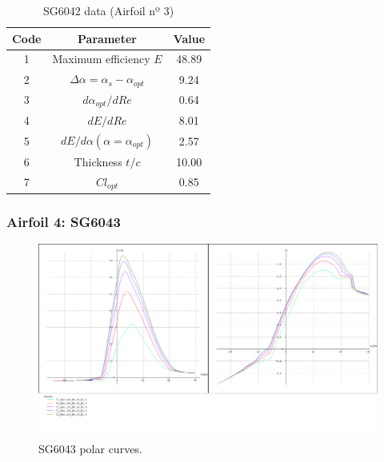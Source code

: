 \documentclass[../TFG_Annex.tex]{subfiles}
\begin{document}
\begin{table}[h!]
	\centering
	\begin{tabular}{c|c|c}
		Code & Parameter                                    & Value  \\ \hline
		1    & Maximum efficiency $E$                      &      48.89          \\
		2    & $\Delta \alpha=\alpha_{s}-\alpha_{opt}$    &            9.24         \\
		3    & ${d\alpha_{opt}}/{dRe}$                     &               0.64    \\
		4    & ${dE}/{dRe}$                                &          8.01          \\
		5    & ${dE}/{d \alpha} (\alpha=\alpha_{opt})$      &        2.57          \\
		6    & Thickness $t/c$                            &           10.00         \\
		7    & $Cl_{opt}$  & 0.85
	\end{tabular}
	\caption{SG6042 data (Airfoil nº 3)}
	\label{tab:Airf3}
\end{table}





\newpage
\subsubsection{Airfoil 4: SG6043}


\begin{figure}[h!]
	\centering
	\includegraphics[width=1\linewidth]{"../../04-Airfoil selection/Imatges airfoils/4-SG6043"}
	\caption{SG6043 polar curves.}
	\label{fig:4-sg6043}
\end{figure}
\end{document}
